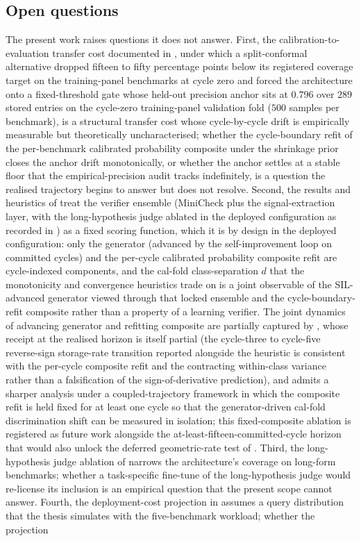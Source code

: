 \subsection{Open questions}
\label{sec:concl-open}

The present work raises questions it does not answer. First, the calibration-to-evaluation transfer cost documented in , under which a split-conformal alternative dropped fifteen to fifty percentage points below its registered coverage target on the training-panel benchmarks at cycle zero and forced the architecture onto a fixed-threshold gate whose held-out precision anchor sits at $0.796$ over $289$ stored entries on the cycle-zero training-panel validation fold ($500$ samples per benchmark), is a structural transfer cost whose cycle-by-cycle drift is empirically measurable but theoretically uncharacterised; whether the cycle-boundary refit of the per-benchmark calibrated probability composite under the shrinkage prior closes the anchor drift monotonically, or whether the anchor settles at a stable floor that the empirical-precision audit tracks indefinitely, is a question the realised trajectory begins to answer but does not resolve. Second, the results and heuristics of  treat the verifier ensemble (MiniCheck plus the signal-extraction layer, with the long-hypothesis judge ablated in the deployed configuration as recorded in ) as a fixed scoring function, which it is by design in the deployed configuration: only the generator (advanced by the self-improvement loop on committed cycles) and the per-cycle calibrated probability composite refit are cycle-indexed components, and the cal-fold class-separation $d$ that the monotonicity and convergence heuristics trade on is a joint observable of the SIL-advanced generator viewed through that locked ensemble and the cycle-boundary-refit composite rather than a property of a learning verifier. The joint dynamics of advancing generator and refitting composite are partially captured by , whose receipt at the realised horizon is itself partial (the cycle-three to cycle-five reverse-sign storage-rate transition reported alongside the heuristic is consistent with the per-cycle composite refit and the contracting within-class variance rather than a falsification of the sign-of-derivative prediction), and admits a sharper analysis under a coupled-trajectory framework in which the composite refit is held fixed for at least one cycle so that the generator-driven cal-fold discrimination shift can be measured in isolation; this fixed-composite ablation is registered as future work alongside the at-least-fifteen-committed-cycle horizon that would also unlock the deferred geometric-rate test of . Third, the long-hypothesis judge ablation of  narrows the architecture's coverage on long-form benchmarks; whether a task-specific fine-tune of the long-hypothesis judge would re-license its inclusion is an empirical question that the present scope cannot answer. Fourth, the deployment-cost projection in  assumes a query distribution that the thesis simulates with the five-benchmark workload; whether the projection 